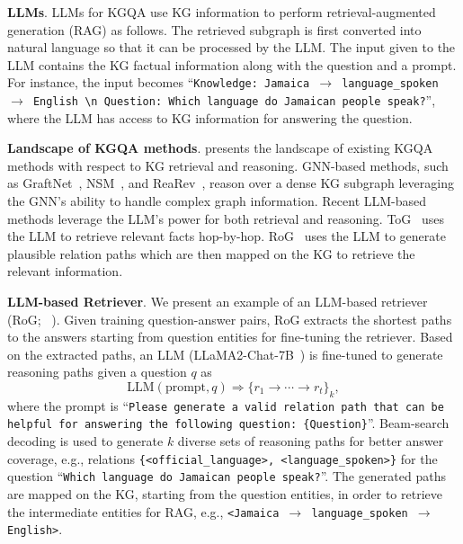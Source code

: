 \documentclass{article}
\theoremstyle{plain}
\theoremstyle{definition}
\theoremstyle{remark}
\begin{document}
\textbf{LLMs}. LLMs for KGQA use KG information to perform retrieval-augmented generation (RAG) as follows. The retrieved subgraph is first converted into natural language so that it can be processed by the LLM. The input given to the LLM contains the KG factual information along with the  question and a prompt. For instance, the input becomes ``\texttt{Knowledge: Jamaica $\rightarrow$ language\_spoken $\rightarrow$ English \textbackslash n Question: Which language do Jamaican people speak?}'', where the LLM has access to KG information for answering the question. 

\textbf{Landscape of KGQA methods}.  presents the landscape of existing KGQA methods with respect to KG retrieval and reasoning. GNN-based methods, such as GraftNet~\citep{sun-etal-2018-open}, NSM~\citep{he2021improving}, and ReaRev~\citep{mavromatis2022rearev}, reason over a dense KG subgraph leveraging the GNN's ability to handle complex graph information. 
Recent LLM-based methods leverage the LLM's power for both retrieval and reasoning. ToG~\citep{sun2024tog} uses the LLM to retrieve relevant facts hop-by-hop. RoG~\citep{luo2024rog} uses the LLM to generate plausible relation paths which are then mapped on the KG to retrieve the relevant information.

\textbf{LLM-based Retriever}. We present an example of an LLM-based retriever (RoG; ~\citep{luo2024rog}). Given training question-answer pairs, RoG extracts the shortest paths to the answers starting from question entities for fine-tuning the retriever. Based on the extracted paths, an LLM (LLaMA2-Chat-7B~\citep{touvron2023llama}) is fine-tuned to generate reasoning paths given a question $q$ as 
\begin{equation}
    \text{LLM}(\text{prompt}, q) \Longrightarrow \{ r_1 \rightarrow \cdots \rightarrow  r_t \}_k,
    \label{eq:rog}
\end{equation}
where the prompt is ``\texttt{Please generate a valid relation path that can be helpful for answering the following question: \{Question\}}''.
Beam-search decoding is used to generate $k$ diverse sets of reasoning paths for better answer coverage, e.g., relations \texttt{\{<official\_language>, <language\_spoken>\}} for the question ``\texttt{Which language do Jamaican people speak?}''. The generated paths are mapped on the KG, starting from the question entities, in order to retrieve the intermediate entities for RAG, e.g.,  \texttt{<Jamaica $\rightarrow$ language\_spoken $\rightarrow$ English>}.
\end{document}
